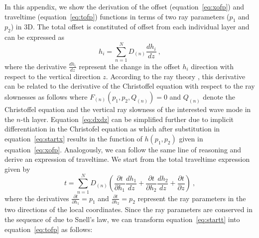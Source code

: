 In this appendix, we show the derivation of the offset (equation~\ref{eq:xofp}) and traveltime (equation~\ref{eq:tofp}) functions in terms of two ray parameters ($p_1$ and $p_2$) in 3D.
The total offset is constituted of offset  from each individual layer and can be expressed as
\begin{equation}
\label{eq:startx}
h_i = \sum\limits^N_{n=1} D_{(n)} \frac{dh_i}{dz}~,
\end{equation}
where the derivative $\frac{dh_i}{dz}$ represent the change in the offset $h_i$ direction with respect to the vertical direction $z$. According to the ray theory \cite[]{cerveny}, this derivative can be related to the derivative of the Christoffel equation with respect to the ray slownesses as follows
where $F_{(n)}(p_1, p_2, Q_{(n)}) = 0 $ and $Q_{(n)}$ denote the Christoffel equation and the vertical ray slowness of the interested wave mode in the $n$-th layer. Equation~\ref{eq:dxdz} can be simplified further due to implicit differentiation in the Christofel equation as
which after substitution in equation~\ref{eq:startx} results in the function of $h(p_1,p_2)$ given in equation~\ref{eq:xofp}. Analogously, we can follow the same line of reasoning and derive an expression of traveltime. We start from the total traveltime expression given by
\begin{equation}
\label{eq:startt}
t = \sum\limits^N_{n=1} D_{(n)} \left( \frac{\partial t}{\partial h_1}\frac{dh_1}{dz}+ \frac{\partial t}{\partial h_2}\frac{dh_2}{dz} + \frac{\partial t}{\partial z} \right)~,
\end{equation}
where the derivatives $\frac{\partial t}{\partial h_1} = p_1$ and $\frac{\partial t}{\partial h_2} = p_2$ represent the ray parameters in the two directions of the local coordinates. Since the ray parameters are conserved in the sequence of  due to Snell's law, we can  transform equation~\ref{eq:startt} into equation~\ref{eq:tofp} as follows:
